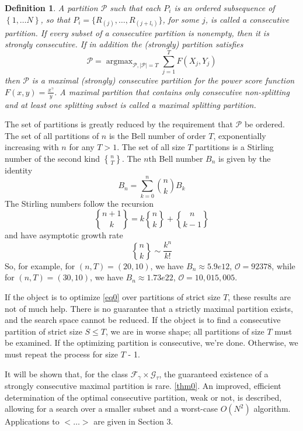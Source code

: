 \documentclass{article}
\newtheorem{definition}{Definition}
\theoremstyle{case}
\DeclareMathOperator*{\argmax}{argmax} %
\newcommand{\stirlingii}{\genfrac{\{}{\}}{0pt}{}}
\begin{document}
\begin{definition}
A partition $\mathcal{P}$ such that each $P_i$ is an ordered subsequence of $\left\lbrace 1, \dots N\right\rbrace$, so that $P_i = \{R_{(j)}, \dots, R_{(j+l_i)}\}$, for some $j$, is called a consecutive partition. If every subset of a consecutive partition is nonempty, then it is strongly consecutive. 
If in addition the (strongly) partition satisfies
\[
\mathcal{P} = \argmax_{\mathcal{P}, \vert \mathcal{P} \vert = T}\sum_{j=1}^{T}F\left( X_j, Y_j \right)
\]
then $\mathcal{P}$ is a maximal (strongly) consecutive partition for the power score function $F(x,y) = \frac{x^\gamma}{y}$. A maximal partition that contains only consecutive non-splitting and at least one splitting subset is called a maximal splitting partition.
\end{definition}

The set of partitions is greatly reduced by the requirement that $\mathcal{P}$ be ordered. The set of all partitions of $n$ is the Bell number of order $T$, exponentially increasing with $n$ for any $T > 1$. The set of all size $T$ partitions is a Stirling number of the second kind $\stirlingii{n}{T}$. The $n$th Bell number $B_n$ is given by the identity
\[B_n = \sum_{k=0}^{n} \binom{n}{k} B_k\]
The Stirling numbers follow the recursion
\[\stirlingii{n+1}{k} = k\stirlingii{n}{k} + \stirlingii{n}{k-1}\]
and have asymptotic growth rate 
\[\stirlingii{n}{k} \sim \frac{k^n}{k!}\]
So, for example, for $\left(n,T\right) = \left(20, 10\right)$, we have $B_n \approx 5.9e12$, $\mathcal{O} = 92378$, while for $\left(n,T\right) = \left(30, 10\right)$, we have $B_n \approx 1.73e22$, $\mathcal{O} = 10,015,005$.

If the object is to optimize \eqref{eq0} over partitions of strict size $T$, these results are not of much help. There is no guarantee that a strictly maximal partition exists, and the search space cannot be reduced. If the object is to find a consecutive partition of strict size $S \le T$, we are in worse shape; all partitions of size $T$ must be examined. If the optimizing partition is consecutive, we're done. Otherwise, we must repeat the process for size $T$ - 1. 

\vspace{4pt}

It will be shown that, for the class $\mathcal{F}_{\gamma} \times \mathcal{G}_{\tau}$, the guaranteed existence of a strongly consecutive maximal partition is rare. \ref{thm0}. An improved, efficient determination of the optimal consecutive partition, weak or not, is described, allowing for a search over a smaller subset and a worst-case $O(N^2)$ algorithm. Applications to $<\dots>$ are given in Section 3.
\end{document}
